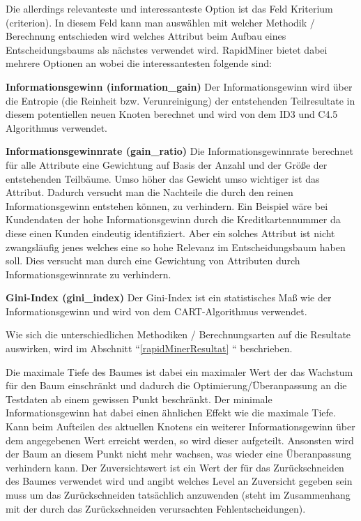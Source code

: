 Die allerdings relevanteste und interessanteste Option ist das Feld Kriterium (criterion). In diesem Feld kann man auswählen mit welcher Methodik / Berechnung entschieden wird welches Attribut beim Aufbau eines Entscheidungsbaums als nächstes verwendet wird. RapidMiner bietet dabei mehrere Optionen an wobei die interessantesten folgende sind:

\begin{pitemize}
\item \textbf{Informationsgewinn (information\_gain)} Der Informationsgewinn wird über die Entropie (die Reinheit bzw. Verunreinigung) der entstehenden Teilresultate in diesem potentiellen neuen Knoten berechnet und wird von dem ID3 und C4.5 Algorithmus verwendet.
\item \textbf{Informationsgewinnrate (gain\_ratio)} Die Informationsgewinnrate berechnet für alle Attribute eine Gewichtung auf Basis der Anzahl und der Größe der entstehenden Teilbäume. Umso höher das Gewicht umso wichtiger ist das Attribut. Dadurch versucht man die Nachteile die durch den reinen Informationsgewinn entstehen können, zu verhindern. Ein Beispiel wäre bei Kundendaten der hohe Informationsgewinn durch die Kreditkartennummer da diese einen Kunden eindeutig identifiziert. Aber ein solches Attribut ist nicht zwangsläufig jenes welches eine so hohe Relevanz im Entscheidungsbaum haben soll. Dies versucht man durch eine Gewichtung von Attributen durch Informationsgewinnrate zu verhindern. \cite{rapidminer_rapidminer_2015} \cite{johannes_furnkranz_decision-tree_2008}
\item \textbf{Gini-Index (gini\_index)} Der Gini-Index ist ein statistisches Maß wie der Informationsgewinn und wird von dem CART-Algorithmus verwendet.
\end{pitemize}

Wie sich die unterschiedlichen Methodiken / Berechnungsarten auf die Resultate auswirken, wird im Abschnitt ``\ref{rapidMinerResultat} `` beschrieben.

Die maximale Tiefe des Baumes ist dabei ein maximaler Wert der das Wachstum für den Baum einschränkt und dadurch die Optimierung/Überanpassung an die Testdaten ab einem gewissen Punkt beschränkt. Der minimale Informationsgewinn hat dabei einen ähnlichen Effekt wie die maximale Tiefe. Kann beim Aufteilen des aktuellen Knotens ein weiterer Informationsgewinn über dem angegebenen Wert erreicht werden, so wird dieser aufgeteilt. Ansonsten wird der Baum an diesem Punkt nicht mehr wachsen, was wieder eine Überanpassung verhindern kann. Der Zuversichtswert ist ein Wert der für das Zurückschneiden des Baumes verwendet wird und angibt welches Level an Zuversicht gegeben sein muss  um das Zurückschneiden tatsächlich anzuwenden (steht im Zusammenhang mit der durch das Zurückschneiden verursachten Fehlentscheidungen). \cite{rapidminer_rapidminer_2015}

